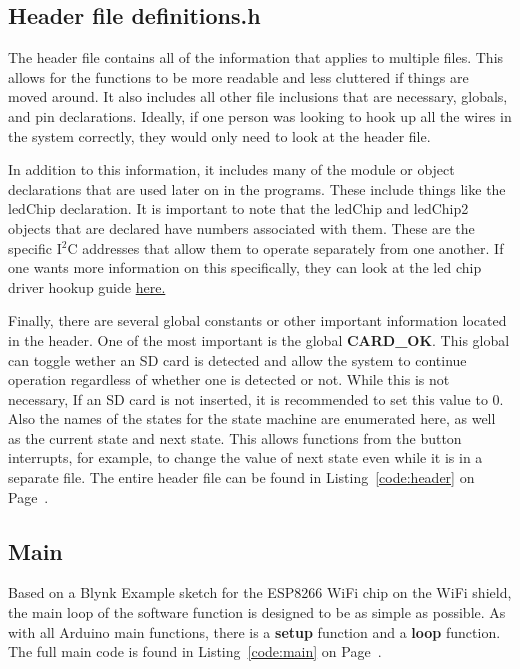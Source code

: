 \documentclass{article}
\begin{document}
\subsection{Header file definitions.h}
The header file contains all of the information that applies to multiple files. This allows for the functions to be more readable and less cluttered if things are moved around. It also includes all other file inclusions that are necessary, globals, and pin declarations. Ideally, if one person was looking to hook up all the wires in the system correctly, they would only need to look at the header file. 

In addition to this information, it includes many of the module or object declarations that are used later on in the programs. These include things like the ledChip declaration. It is important to note that the ledChip and ledChip2 objects that are declared have numbers associated with them. These are the specific I$^2$C addresses that allow them to operate separately from one another. If one wants more information on this specifically, they can look at the led chip driver hookup guide \href{https://learn.sparkfun.com/tutorials/lp55231-breakout-board-hookup-guide/all}{here.} 

Finally, there are several global constants or other important information located in the header. One of the most important is the global \textbf{CARD\_OK}. This global can toggle wether an SD card is detected and allow the system to continue operation regardless of whether one is detected or not. While this is not necessary, If an SD card is not inserted, it is recommended to set this value to 0. Also the names of the states for the state machine are enumerated here, as well as the current state and next state. This allows functions from the button interrupts, for example, to change the value of next state even while it is in a separate file. The entire header file can be found in Listing~\ref{code:header} on Page~\pageref{code:header}.

\subsection{Main}
Based on a Blynk Example sketch for the ESP8266 WiFi chip on the WiFi shield, the main loop of the software function is designed to be as simple as possible. As with all Arduino main functions, there is a \textbf{setup} function and a \textbf{loop} function. The full main code is found in Listing~\ref{code:main} on Page~\pageref{code:main}. 
\end{document}

